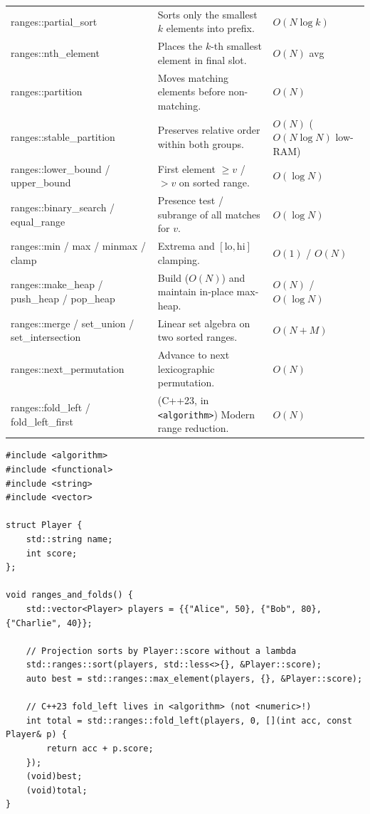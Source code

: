 \documentclass[11pt,a4paper]{article}
\begin{document}
\begin{xltabular}{\textwidth}{>{\raggedright\arraybackslash\ttfamily}p{4.3cm} >{\raggedright\arraybackslash}X >{\raggedright\arraybackslash}p{3.1cm}}
ranges::partial\_sort & Sorts only the smallest $k$ elements into prefix. & $O(N \log k)$ \\
ranges::nth\_element & Places the $k$-th smallest element in final slot. & $O(N)$ avg \\
ranges::partition & Moves matching elements before non-matching. & $O(N)$ \\
ranges::stable\_partition & Preserves relative order within both groups. & $O(N)$ ($O(N \log N)$ low-RAM) \\
ranges::lower\_bound / upper\_bound & First element $\ge v$ / $> v$ on sorted range. & $O(\log N)$ \\
ranges::binary\_search / equal\_range & Presence test / subrange of all matches for $v$. & $O(\log N)$ \\
ranges::min / max / minmax / clamp & Extrema and $[\text{lo}, \text{hi}]$ clamping. & $O(1)$ / $O(N)$ \\
ranges::make\_heap / push\_heap / pop\_heap & Build ($O(N)$) and maintain in-place max-heap. & $O(N)$ / $O(\log N)$ \\
ranges::merge / set\_union / set\_intersection & Linear set algebra on two sorted ranges. & $O(N + M)$ \\
ranges::next\_permutation & Advance to next lexicographic permutation. & $O(N)$ \\
ranges::fold\_left / fold\_left\_first & (C++23, in \texttt{<algorithm>}) Modern range reduction. & $O(N)$ \\
\end{xltabular}\endgroup

\begin{lstlisting}[caption={Projections (\texttt{\&Player::score}) and C++23 \texttt{std::ranges::fold\_left} (\texttt{<algorithm>})}]
#include <algorithm>
#include <functional>
#include <string>
#include <vector>

struct Player {
    std::string name;
    int score;
};

void ranges_and_folds() {
    std::vector<Player> players = {{"Alice", 50}, {"Bob", 80}, {"Charlie", 40}};

    // Projection sorts by Player::score without a lambda
    std::ranges::sort(players, std::less<>{}, &Player::score);
    auto best = std::ranges::max_element(players, {}, &Player::score);

    // C++23 fold_left lives in <algorithm> (not <numeric>!)
    int total = std::ranges::fold_left(players, 0, [](int acc, const Player& p) {
        return acc + p.score;
    });
    (void)best;
    (void)total;
}
\end{lstlisting}
\end{document}
